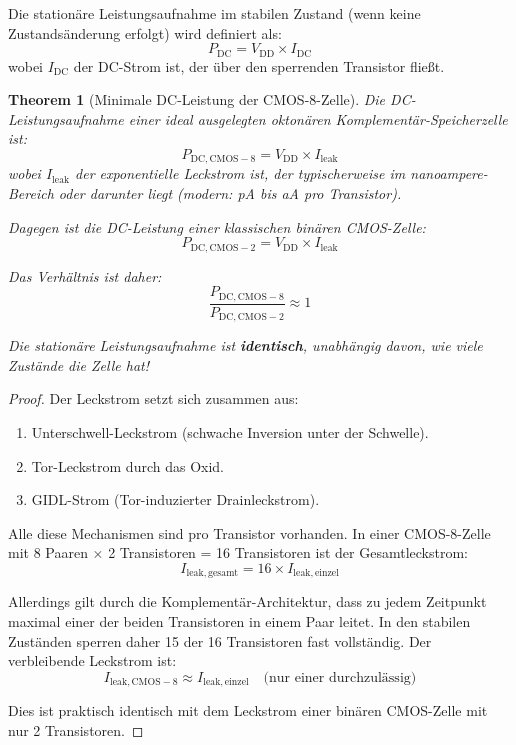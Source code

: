 \documentclass[12pt, a4paper]{article}
\newtheorem{theorem}{Theorem}[section]
\theoremstyle{definition}
\theoremstyle{remark}
\begin{document}
Die stationäre Leistungsaufnahme im stabilen Zustand (wenn keine Zustandsänderung erfolgt) wird definiert als:
\[
P_{\mathrm{DC}} = V_{\mathrm{DD}} \times I_{\mathrm{DC}}
\]
wobei $I_{\mathrm{DC}}$ der DC-Strom ist, der über den sperrenden Transistor fließt.

\begin{theorem}[Minimale DC-Leistung der CMOS-8-Zelle]
\label{thm:minimale_dc_leistung}
Die DC-Leistungsaufnahme einer ideal ausgelegten oktonären Komplementär-Speicherzelle ist:
\[
P_{\mathrm{DC, CMOS-8}} = V_{\mathrm{DD}} \times I_{\mathrm{leak}}
\]
wobei $I_{\mathrm{leak}}$ der exponentielle Leckstrom ist, der typischerweise im nanoampere-Bereich oder darunter liegt (modern: pA bis aA pro Transistor).

Dagegen ist die DC-Leistung einer klassischen binären CMOS-Zelle:
\[
P_{\mathrm{DC, CMOS-2}} = V_{\mathrm{DD}} \times I_{\mathrm{leak}}
\]

Das Verhältnis ist daher:
\[
\frac{P_{\mathrm{DC, CMOS-8}}}{P_{\mathrm{DC, CMOS-2}}} \approx 1
\]

Die stationäre Leistungsaufnahme ist \textbf{identisch}, unabhängig davon, wie viele Zustände die Zelle hat!
\end{theorem}

\begin{proof}
Der Leckstrom setzt sich zusammen aus:
\begin{enumerate}[label=(\alph*)]
  \item Unterschwell-Leckstrom (schwache Inversion unter der Schwelle).
  \item Tor-Leckstrom durch das Oxid.
  \item GIDL-Strom (Tor-induzierter Drainleckstrom).
\end{enumerate}

Alle diese Mechanismen sind pro Transistor vorhanden. In einer CMOS-8-Zelle mit 8 Paaren × 2 Transistoren = 16 Transistoren ist der Gesamtleckstrom:
\[
I_{\mathrm{leak, gesamt}} = 16 \times I_{\mathrm{leak, einzel}}
\]

Allerdings gilt durch die Komplementär-Architektur, dass zu jedem Zeitpunkt maximal einer der beiden Transistoren in einem Paar leitet. In den stabilen Zuständen sperren daher 15 der 16 Transistoren fast vollständig. Der verbleibende Leckstrom ist:
\[
I_{\mathrm{leak, CMOS-8}} \approx I_{\mathrm{leak, einzel}} \quad \text{(nur einer durchzulässig)}
\]

Dies ist praktisch identisch mit dem Leckstrom einer binären CMOS-Zelle mit nur 2 Transistoren.
\end{proof}
\end{document}
